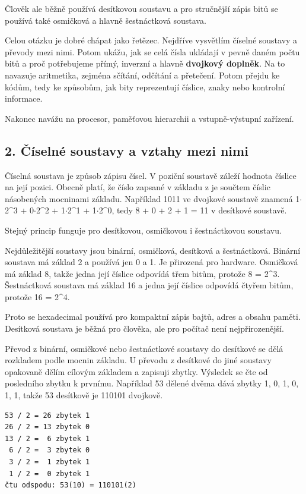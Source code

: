 Člověk ale běžně používá desítkovou soustavu a pro stručnější zápis bitů se používá také osmičková a hlavně šestnáctková soustava.

Celou otázku je dobré chápat jako řetězec. Nejdříve vysvětlím číselné soustavy a převody mezi nimi. Potom ukážu, jak se celá čísla ukládají v pevně daném počtu bitů a proč potřebujeme přímý, inverzní a hlavně \textbf{dvojkový doplněk}. Na to navazuje aritmetika, zejména sčítání, odčítání a přetečení. Potom přejdu ke kódům, tedy ke způsobům, jak bity reprezentují číslice, znaky nebo kontrolní informace.

Nakonec navážu na procesor, paměťovou hierarchii a vstupně-výstupní zařízení.

\subsection*{2. Číselné soustavy a vztahy mezi nimi}

Číselná soustava je způsob zápisu čísel. V poziční soustavě záleží hodnota číslice na její pozici. Obecně platí, že číslo zapsané v základu z je součtem číslic násobených mocninami základu. Například 1011 ve dvojkové soustavě znamená 1$\cdot$2\textasciicircum{}3 + 0$\cdot$2\textasciicircum{}2 + 1$\cdot$2\textasciicircum{}1 + 1$\cdot$2\textasciicircum{}0, tedy 8 + 0 + 2 + 1 = 11 v desítkové soustavě.

Stejný princip funguje pro desítkovou, osmičkovou i šestnáctkovou soustavu.

Nejdůležitější soustavy jsou binární, osmičková, desítková a šestnáctková. Binární soustava má základ 2 a používá jen 0 a 1. Je přirozená pro hardware. Osmičková má základ 8, takže jedna její číslice odpovídá třem bitům, protože 8 = 2\textasciicircum{}3. Šestnáctková soustava má základ 16 a jedna její číslice odpovídá čtyřem bitům, protože 16 = 2\textasciicircum{}4.

Proto se hexadecimal používá pro kompaktní zápis bajtů, adres a obsahu paměti. Desítková soustava je běžná pro člověka, ale pro počítač není nejpřirozenější.

Převod z binární, osmičkové nebo šestnáctkové soustavy do desítkové se dělá rozkladem podle mocnin základu. U převodu z desítkové do jiné soustavy opakovaně dělím cílovým základem a zapisuji zbytky. Výsledek se čte od posledního zbytku k prvnímu. Například 53 dělené dvěma dává zbytky 1, 0, 1, 0, 1, 1, takže 53 desítkově je 110101 dvojkově.

\begin{codebox}
\small
\begin{verbatim}
53 / 2 = 26 zbytek 1
26 / 2 = 13 zbytek 0
13 / 2 =  6 zbytek 1
 6 / 2 =  3 zbytek 0
 3 / 2 =  1 zbytek 1
 1 / 2 =  0 zbytek 1
čtu odspodu: 53(10) = 110101(2)
\end{verbatim}
\end{codebox}

